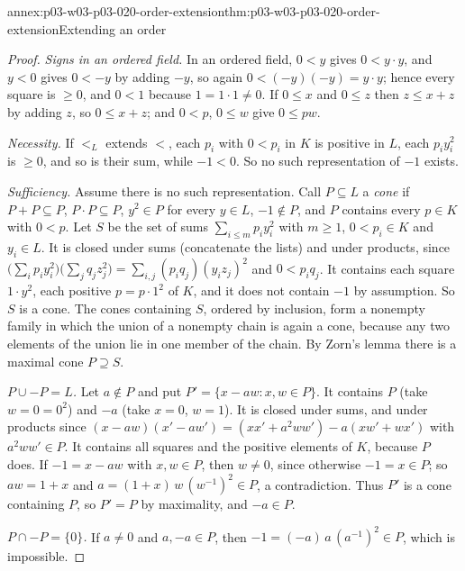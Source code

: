 \begin{annexitem}{annex:p03-w03-p03-020-order-extension}{thm:p03-w03-p03-020-order-extension}{Extending an order}
\begin{proof}
\emph{Signs in an ordered field.} In an ordered field, \(0<y\) gives
\(0<y\mathbin{\cdot}y\), and \(y<0\) gives \(0<-y\) by adding \(-y\), so
again \(0<(-y)(-y)=y\mathbin{\cdot}y\); hence every square is \(\ge0\), and
\(0<1\) because \(1=1\cdot1\ne0\). If \(0\le x\) and \(0\le z\) then
\(z\le x+z\) by adding \(z\), so \(0\le x+z\); and \(0<p\), \(0\le w\) give
\(0\le pw\).

\emph{Necessity.} If \(<_L\) extends \(<\), each \(p_i\) with \(0<p_i\) in
\(K\) is positive in \(L\), each \(p_iy_i^2\) is \(\ge0\), and so is their
sum, while \(-1<0\). So no such representation of \(-1\) exists.

\emph{Sufficiency.} Assume there is no such representation. Call
\(P\subseteq L\) a \emph{cone} if \(P+P\subseteq P\), \(P\cdot P\subseteq
P\), \(y^2\in P\) for every \(y\in L\), \(-1\notin P\), and \(P\) contains
every \(p\in K\) with \(0<p\). Let \(S\) be the set of sums
\(\sum_{i\le m}p_iy_i^2\) with \(m\ge1\), \(0<p_i\in K\) and \(y_i\in L\).
It is closed under sums (concatenate the lists) and under products, since
\(\bigl(\sum_ip_iy_i^2\bigr)\bigl(\sum_jq_jz_j^2\bigr)=\sum_{i,j}(p_iq_j)(y_iz_j)^2\)
and \(0<p_iq_j\). It contains each square \(1\cdot y^2\), each positive
\(p=p\cdot1^2\) of \(K\), and it does not contain \(-1\) by assumption. So
\(S\) is a cone. The cones containing \(S\), ordered by inclusion, form a
nonempty family in which the union of a nonempty chain is again a cone,
because any two elements of the union lie in one member of the chain. By
Zorn's lemma there is a maximal cone \(P\supseteq S\).

\emph{\(P\cup-P=L\).} Let \(a\notin P\) and put
\(P'=\{x-aw:x,w\in P\}\). It contains \(P\) (take \(w=0=0^2\)) and \(-a\)
(take \(x=0\), \(w=1\)). It is closed under sums, and under products since
\((x-aw)(x'-aw')=(xx'+a^2ww')-a(xw'+wx')\) with \(a^2ww'\in P\). It
contains all squares and the positive elements of \(K\), because \(P\) does.
If \(-1=x-aw\) with \(x,w\in P\), then \(w\ne0\), since otherwise
\(-1=x\in P\); so \(aw=1+x\) and
\(a=(1+x)\,w\,(w^{-1})^2\in P\), a contradiction. Thus \(P'\) is a cone
containing \(P\), so \(P'=P\) by maximality, and \(-a\in P\).

\emph{\(P\cap-P=\{0\}\).} If \(a\ne0\) and \(a,-a\in P\), then
\(-1=(-a)\,a\,(a^{-1})^2\in P\), which is impossible.


\end{proof}
\end{annexitem}
